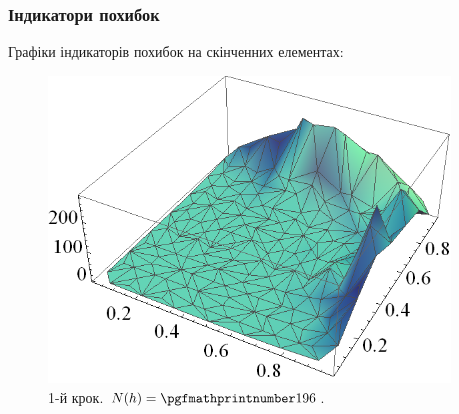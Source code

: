 \begin{frame}[allowframebreaks]
	\frametitle<presentation>{Індикатори похибок}
		Графіки індикаторів похибок на скінченних елементах:
		\begin{figure}[H]
			\begin{columns}
			 	\begin{column}{0.5\textwidth}
			 		\includegraphics[width=\textwidth]{problem2/my/AEE/aee1}
			 	 \end{column}
			     \begin{column}{0.3\textwidth}
			     	\caption*{1-й крок. $N(h) = \nn{196}$.}
			     \end{column}
		     \end{columns}
		\end{figure}


\end{frame}
